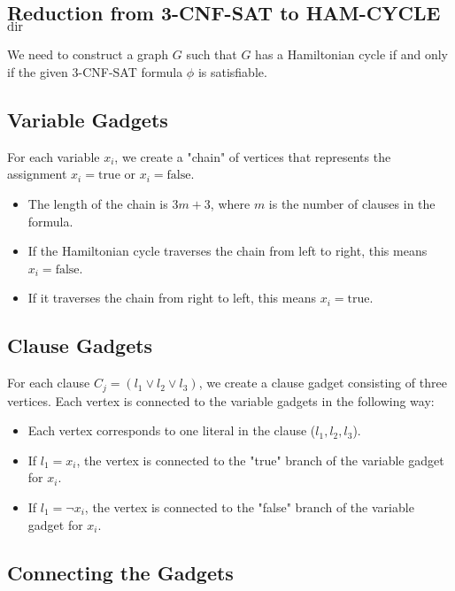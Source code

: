 \documentclass[10pt,letter,notitlepage]{article}
\begin{document}
\begin{Answer}

\section*{Reduction from 3-CNF-SAT to HAM-CYCLE\(_{\text{dir}}\)}

We need to construct a graph \(G\) such that \(G\) has a Hamiltonian cycle if and only if the given 3-CNF-SAT formula \(\phi\) is satisfiable.

\subsection*{Variable Gadgets}

For each variable \(x_i\), we create a "chain" of vertices that represents the assignment \(x_i = \text{true}\) or \(x_i = \text{false}\). 

\begin{itemize}
    \item The length of the chain is \(3m + 3\), where \(m\) is the number of clauses in the formula.
    \item If the Hamiltonian cycle traverses the chain from left to right, this means \(x_i = \text{false}\).
    \item If it traverses the chain from right to left, this means \(x_i = \text{true}\).
\end{itemize}

\subsection*{Clause Gadgets}

For each clause \(C_j = (l_1 \lor l_2 \lor l_3)\), we create a clause gadget consisting of three vertices. Each vertex is connected to the variable gadgets in the following way:

\begin{itemize}
    \item Each vertex corresponds to one literal in the clause (\(l_1, l_2, l_3\)).
    \item If \(l_1 = x_i\), the vertex is connected to the "true" branch of the variable gadget for \(x_i\).
    \item If \(l_1 = \neg x_i\), the vertex is connected to the "false" branch of the variable gadget for \(x_i\).
\end{itemize}

\subsection*{Connecting the Gadgets}


\end{Answer}
\end{document}
